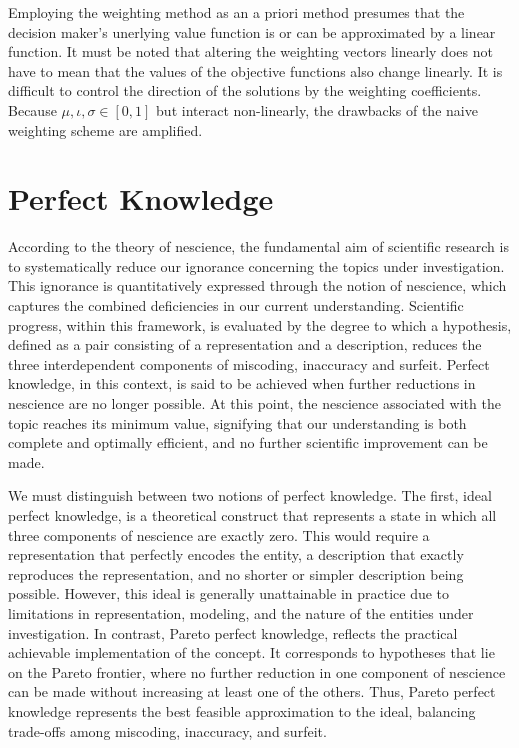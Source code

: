 Employing the weighting method as an a priori method presumes that the decision maker's unerlying value function is or can be approximated by a linear function. It must be noted that altering the weighting vectors linearly does not have to mean that the values of the objective functions also change linearly. It is difficult to control the direction of the solutions by the weighting coefficients. Because $\mu,\iota,\sigma \in [0,1]$ but interact non-linearly, the drawbacks of the naive weighting scheme are amplified.

%
%

\section{Perfect Knowledge}
\label{sec:perfect_knowledge}

According to the theory of nescience, the fundamental aim of scientific research is to systematically reduce our ignorance concerning the topics under investigation. This ignorance is quantitatively expressed through the notion of nescience, which captures the combined deficiencies in our current understanding. Scientific progress, within this framework, is evaluated by the degree to which a hypothesis, defined as a pair consisting of a representation and a description, reduces the three interdependent components of miscoding, inaccuracy and surfeit. Perfect knowledge, in this context, is said to be achieved when further reductions in nescience are no longer possible. At this point, the nescience associated with the topic reaches its minimum value, signifying that our understanding is both complete and optimally efficient, and no further scientific improvement can be made.

We must distinguish between two notions of perfect knowledge. The first, ideal perfect knowledge, is a theoretical construct that represents a state in which all three components of nescience are exactly zero. This would require a representation that perfectly encodes the entity, a description that exactly reproduces the representation, and no shorter or simpler description being possible. However, this ideal is generally unattainable in practice due to limitations in representation, modeling, and the nature of the entities under investigation. In contrast, Pareto perfect knowledge, reflects the practical achievable implementation of the concept. It corresponds to hypotheses that lie on the Pareto frontier, where no further reduction in one component of nescience can be made without increasing at least one of the others. Thus, Pareto perfect knowledge represents the best feasible approximation to the ideal, balancing trade-offs among miscoding, inaccuracy, and surfeit.

